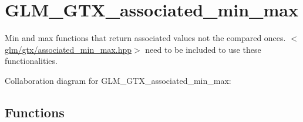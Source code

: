 \hypertarget{group__gtx__associated__min__max}{}\section{G\+L\+M\+\_\+\+G\+T\+X\+\_\+associated\+\_\+min\+\_\+max}
\label{group__gtx__associated__min__max}


Min and max functions that return associated values not the compared onces. $<$\hyperlink{associated__min__max_8hpp}{glm/gtx/associated\+\_\+min\+\_\+max.\+hpp}$>$ need to be included to use these functionalities.  


Collaboration diagram for G\+L\+M\+\_\+\+G\+T\+X\+\_\+associated\+\_\+min\+\_\+max\+:
\subsection*{Functions}

